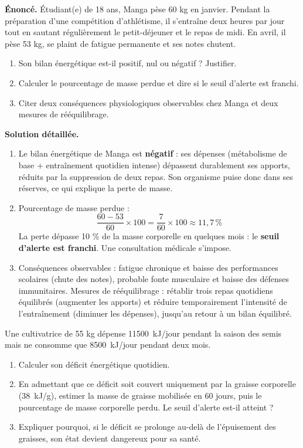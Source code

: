 \documentclass[11pt]{article}
\begin{document}
\begin{exoresolu}
\textbf{Énoncé.} Étudiant(e) de 18 ans, Manga pèse 60 kg en janvier. Pendant la préparation d'une compétition d'athlétisme, il s'entraîne deux heures par jour tout en sautant régulièrement le petit-déjeuner et le repas de midi. En avril, il pèse 53 kg, se plaint de fatigue permanente et ses notes chutent.
\begin{enumerate}
\item Son bilan énergétique est-il positif, nul ou négatif ? Justifier.
\item Calculer le pourcentage de masse perdue et dire si le seuil d'alerte est franchi.
\item Citer deux conséquences physiologiques observables chez Manga et deux mesures de rééquilibrage.
\end{enumerate}
\tcblower
\textbf{Solution détaillée.}
\begin{enumerate}
\item Le bilan énergétique de Manga est \textbf{négatif} : ses dépenses (métabolisme de base + entraînement quotidien intense) dépassent durablement ses apports, réduits par la suppression de deux repas. Son organisme puise donc dans ses réserves, ce qui explique la perte de masse.
\item Pourcentage de masse perdue :
\[ \frac{60 - 53}{60} \times 100 = \frac{7}{60} \times 100 \approx 11,7\,\% \]
La perte dépasse 10 \% de la masse corporelle en quelques mois : le \textbf{seuil d'alerte est franchi}. Une consultation médicale s'impose.
\item Conséquences observables : fatigue chronique et baisse des performances scolaires (chute des notes), probable fonte musculaire et baisse des défenses immunitaires. Mesures de rééquilibrage : rétablir trois repas quotidiens équilibrés (augmenter les apports) et réduire temporairement l'intensité de l'entraînement (diminuer les dépenses), jusqu'au retour à un bilan équilibré.
\end{enumerate}
\end{exoresolu}

\begin{exercice}
Une cultivatrice de 55 kg dépense \SI{11500}{\kilo\joule/jour} pendant la saison des semis mais ne consomme que \SI{8500}{\kilo\joule/jour} pendant deux mois.
\begin{enumerate}
\item Calculer son déficit énergétique quotidien.
\item En admettant que ce déficit soit couvert uniquement par la graisse corporelle (\SI{38}{\kilo\joule/g}), estimer la masse de graisse mobilisée en 60 jours, puis le pourcentage de masse corporelle perdu. Le seuil d'alerte est-il atteint ?
\item Expliquer pourquoi, si le déficit se prolonge au-delà de l'épuisement des graisses, son état devient dangereux pour sa santé.
\end{enumerate}
\end{exercice}
\end{document}
